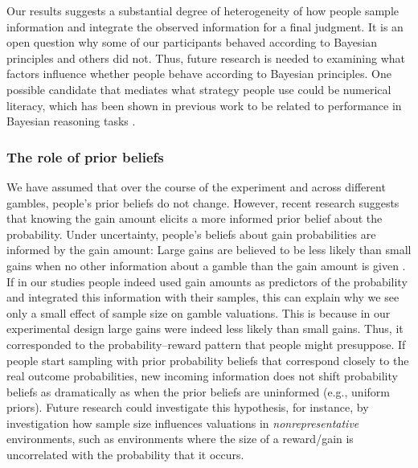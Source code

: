 \documentclass[a4paper, man, natbib, floatsintext]{apa6}
\begin{document}
Our results suggests a substantial degree of heterogeneity of how people sample information and integrate the observed information for a final judgment. It is an open question why some of our participants behaved according to Bayesian principles and others did not. Thus, future research is needed to examining what factors influence whether people behave according to Bayesian principles. One possible candidate that mediates what strategy people use could be numerical literacy, which has been shown in previous work to be related to performance in Bayesian reasoning tasks \citep{Brase2017}.

\subsubsection{The role of prior beliefs}

We have assumed that over the course of the experiment and across different gambles, people's prior beliefs do not change. However, recent research suggests that knowing the gain amount elicits a more informed prior belief about the probability. Under uncertainty, people's beliefs about gain probabilities are informed by the gain amount: Large gains are believed to be less likely than small gains when no other information about a gamble than the gain amount is given \citep{Pleskac2014, Hoffart2018}. If in our studies people indeed used gain amounts as predictors of the probability and integrated this information with their samples, this can explain why we see only a small effect of sample size on gamble valuations. This is because in our experimental design large gains were indeed less likely than small gains. Thus, it corresponded to the probability--reward pattern that people might presuppose. If people start sampling with prior probability beliefs that correspond closely to the real outcome probabilities, new incoming information does not shift probability beliefs as dramatically as when the prior beliefs are uninformed (e.g., uniform priors). Future research could investigate this hypothesis, for instance, by investigation how sample size influences valuations in \textit{nonrepresentative} environments, such as environments where the size of a reward/gain is uncorrelated with the probability that it occurs.
\end{document}
